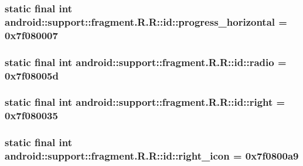 \hypertarget{classandroid_1_1support_1_1fragment_1_1_r_1_1id_1a555ee800c544ccd666d021b767fbca}{
\subsubsection[{progress\_\-horizontal}]{\setlength{\rightskip}{0pt plus 5cm}static final int android::support::fragment.R.R::id::progress\_\-horizontal = 0x7f080007}}
\label{classandroid_1_1support_1_1fragment_1_1_r_1_1id_1a555ee800c544ccd666d021b767fbca}


\hypertarget{classandroid_1_1support_1_1fragment_1_1_r_1_1id_c9e4c18932f85118b95496c554429bb4}{
\subsubsection[{radio}]{\setlength{\rightskip}{0pt plus 5cm}static final int android::support::fragment.R.R::id::radio = 0x7f08005d}}
\label{classandroid_1_1support_1_1fragment_1_1_r_1_1id_c9e4c18932f85118b95496c554429bb4}


\hypertarget{classandroid_1_1support_1_1fragment_1_1_r_1_1id_0364d753f21a30d7f9d9c4ed35942e7e}{
\subsubsection[{right}]{\setlength{\rightskip}{0pt plus 5cm}static final int android::support::fragment.R.R::id::right = 0x7f080035}}
\label{classandroid_1_1support_1_1fragment_1_1_r_1_1id_0364d753f21a30d7f9d9c4ed35942e7e}


\hypertarget{classandroid_1_1support_1_1fragment_1_1_r_1_1id_53b107a82878f5199f81a831a2189a20}{
\subsubsection[{right\_\-icon}]{\setlength{\rightskip}{0pt plus 5cm}static final int android::support::fragment.R.R::id::right\_\-icon = 0x7f0800a9}}
\label{classandroid_1_1support_1_1fragment_1_1_r_1_1id_53b107a82878f5199f81a831a2189a20}


